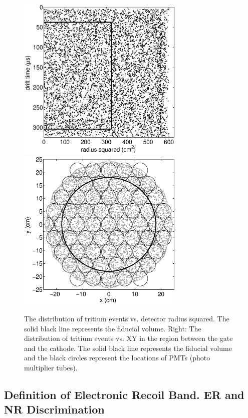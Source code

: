 \renewcommand{\baselinestretch}{1}
\small\normalsize
\begin{figure}[h!]\centering
\includegraphics[width=80mm]{Chapter_T/Figures/CH3T_RZ_scatter_lux10_20130812T1546.eps}
\includegraphics[width=80mm]{Chapter_T/Figures/CH3T_XY_scatter_PMT_lux10_20130812T1546.eps}
\caption{The distribution of tritium events vs. detector radius squared. The solid black line represents the fiducial volume.
 Right: The distribution of tritium events vs. XY in the region between the gate and the cathode. The solid black line represents the fiducial volume and the black circles represent the locations of PMTs (photo multiplier tubes).}
\label{fig:Density}
\end{figure}
\renewcommand{\baselinestretch}{2}
\small\normalsize



\subsection{Definition of Electronic Recoil Band. ER and NR Discrimination}

